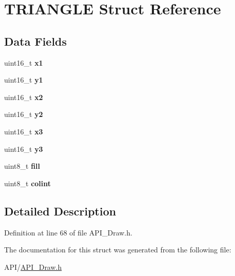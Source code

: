\hypertarget{struct_t_r_i_a_n_g_l_e}{}\section{T\+R\+I\+A\+N\+G\+LE Struct Reference}
\label{struct_t_r_i_a_n_g_l_e}
\subsection*{Data Fields}
\begin{DoxyCompactItemize}
\item 
\mbox{\label{struct_t_r_i_a_n_g_l_e_aedb5fdfe3c1d1a915b668ba7f3950753}} 
uint16\+\_\+t {\bfseries x1}
\item 
\mbox{\label{struct_t_r_i_a_n_g_l_e_a47ada631c22a9d40348069145654f255}} 
uint16\+\_\+t {\bfseries y1}
\item 
\mbox{\label{struct_t_r_i_a_n_g_l_e_ac5bc000f8954f38b7a641a485a26bae7}} 
uint16\+\_\+t {\bfseries x2}
\item 
\mbox{\label{struct_t_r_i_a_n_g_l_e_aa377184ba406b3f0c4ac18c935378204}} 
uint16\+\_\+t {\bfseries y2}
\item 
\mbox{\label{struct_t_r_i_a_n_g_l_e_a2f8dbfe5dea533f606bd224181217ad5}} 
uint16\+\_\+t {\bfseries x3}
\item 
\mbox{\label{struct_t_r_i_a_n_g_l_e_a2922864d422c08ee7c383363fa3f8923}} 
uint16\+\_\+t {\bfseries y3}
\item 
\mbox{\label{struct_t_r_i_a_n_g_l_e_a2ffb43952012965173826ee9554c864a}} 
uint8\+\_\+t {\bfseries fill}
\item 
\mbox{\label{struct_t_r_i_a_n_g_l_e_a21caa4b27a71b7967f1a2d64f196a674}} 
uint8\+\_\+t {\bfseries colint}
\end{DoxyCompactItemize}


\subsection{Detailed Description}


Definition at line 68 of file A\+P\+I\+\_\+\+Draw.\+h.



The documentation for this struct was generated from the following file\+:\begin{DoxyCompactItemize}
\item 
A\+P\+I/\hyperlink{_a_p_i___draw_8h}{A\+P\+I\+\_\+\+Draw.\+h}\end{DoxyCompactItemize}

